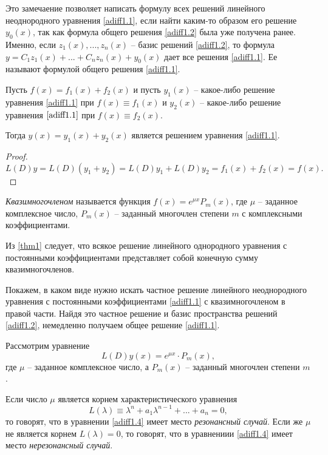 Это замечаение позволяет написать формулу всех решений линейного неоднородного уравнения \eqref{adiff1.1}, если найти каким-то образом его решение $y_0(x)$, так как формула общего решения \eqref{adiff1.2} была уже получена ранее. Именно, если $z_1(x),...,z_n(x)$ -- базис решений \eqref{adiff1.2}, то формула $y=C_1z_1(x)+...+C_nz_n(x)+y_0(x)$ дает все решения \eqref{adiff1.1}. Ее называют формулой общего решения \eqref{adiff1.1}.

\begin{lemm}
Пусть $f(x)=f_1(x)+f_2(x)$ и пусть $y_1(x)$ -- какое-либо решение уравнения \eqref{adiff1.1} при $f(x)\equiv f_1(x)$ и $y_2(x)$ -- какое-либо решение уравнения $\eqref{adiff1.1}$ при $f(x) \equiv f_2(x)$.

Тогда $y(x)=y_1(x)+y_2(x)$ является решением уравнения \eqref{adiff1.1}.
\end{lemm}

\begin{proof}
$$
L(D)y=L(D)(y_1+y_2)=L(D)y_1+L(D)y_2=f_1(x)+f_2(x)=f(x).
$$
\end{proof}

\begin{defn}
\textit{Квазимногочленом} называется функция $f(x)=e^{\mu x}P_m(x)$, где $\mu$ -- заданное комплексное число, $P_m(x)$ -- заданный многочлен степени $m$ с комплексными коэффициентами.
\end{defn}

Из \ref{thm1} следует, что всякое решение линейного однородного уравнения с постоянными коэффициентами представляет собой конечную сумму квазимногочленов.

Покажем, в каком виде нужно искать частное решение линейного неоднородного уравнения с постоянными коэффициентами \eqref{adiff1.1} с квазимногочленом в правой части. Найдя это частное решение и базис пространства решений \eqref{adiff1.2}, немедленно получаем общее решение \eqref{adiff1.1}.

Рассмотрим уравнение
\begin{equation}\label{adiff1.4}
L(D)y(x)=e^{\mu x}\cdot P_m(x),
\end{equation}
где $\mu$ -- заданное комплексное число, а $P_m(x)$ -- заданный многочлен степени $m$.

\begin{defn}
Если число $\mu$ является корнем характеристического уравнения
$$
L(\lambda)\equiv \lambda^n+a_1\lambda^{n-1}+...+a_n=0,
$$
то говорят, что в уравнении \eqref{adiff1.4} имеет место \textit{резонансный случай}. Если же $\mu$ не является корнем $L(\lambda)=0$, то говорят, что в уравнениии \eqref{adiff1.4} имеет место \textit{нерезонансный случай}.
\end{defn}

